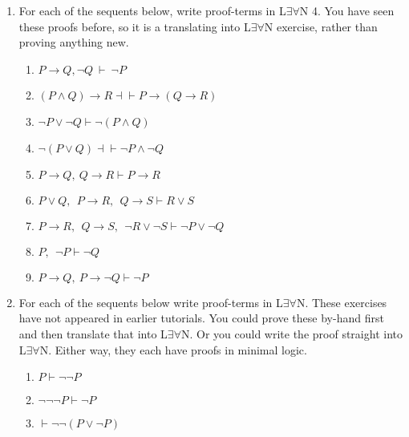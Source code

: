 \documentclass[11pt]{report}
\begin{document}
\begin{enumerate}
	\item For each of the sequents below, write proof-terms in L$\exists\forall$N 4. You have seen these proofs before, so it is a translating into L$\exists\forall$N exercise, rather than proving anything new. 
	 
	\begin{enumerate}
		\item $P \to Q, \lnot Q \ \vdash \ \lnot P$
		\item $( P\land  Q) \rightarrow  R \dashv\vdash  P\rightarrow ( Q \rightarrow  R) $
		\item $\lnot P\lor \lnot Q \vdash \lnot( P\land  Q)$
		\item $\lnot( P\lor  Q) \dashv\vdash \lnot  P\land \lnot  Q$
		\item $ P\rightarrow  Q, \  Q \rightarrow  R \vdash  P\rightarrow  R $
		\item $ P\lor  Q,\ \  P\to  R,\ \  Q \to  S \vdash   R \lor  S$
		\item $ P\to  R,\ \  Q \to  S,\ \ \neg R \lor \neg  S \vdash  \neg P\lor \neg  Q$
		\item $ P,\ \ \neg  P\vdash  \neg  Q$
	   	\item $ P\rightarrow Q, \  P\rightarrow \lnot Q \vdash \lnot  P$
	\end{enumerate}

	\item For each of the sequents below write proof-terms in L$\exists\forall$N. These exercises have not appeared in earlier tutorials. You could prove these by-hand first and then translate that into L$\exists\forall$N. Or you could write the proof straight into L$\exists\forall$N. Either way, they each have proofs in minimal logic. 
	
		\begin{enumerate}
			\item $P \vdash \lnot\lnot P$
			\item $\lnot\lnot\lnot P \vdash \lnot P$
			\item $ \vdash \lnot \lnot (P \lor \lnot P)$
		\end{enumerate}

\end{enumerate}
	
\end{document}
